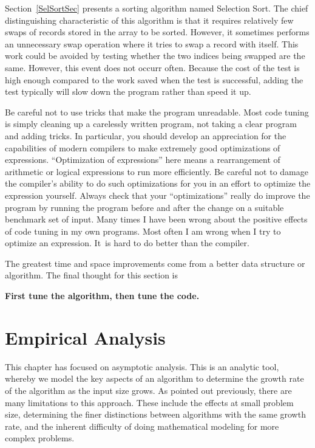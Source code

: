 \begin{example}
Section~\ref{SelSortSec} presents a sorting algorithm named Selection
Sort.
The chief distinguishing characteristic of this algorithm is that it
requires relatively few swaps of records stored in the array to be
sorted.
However, it sometimes performs an unnecessary swap operation where
it tries to swap a record with itself.
This work could be avoided by testing whether the two indices being
swapped are the same.
However, this event does not occurr often.
Because the cost of the test is high enough compared to 
the work saved when the test is successful,
adding the test typically will slow down the program rather
than speed it up.
\end{example}

Be careful not to use tricks that make the program unreadable.
Most code tuning is simply cleaning up a carelessly written program,
not taking a clear program and adding tricks.
In particular, you should develop an appreciation for the
capabilities of modern compilers to make
extremely good optimizations of expressions.
``Optimization of expressions'' here means a rearrangement of
arithmetic or logical expressions to run more efficiently.
Be careful not to damage the compiler's ability to do such
optimizations for you in an effort to optimize the expression
yourself.
Always check that your ``optimizations'' really do improve the
program by running the program before and after the change on a
suitable benchmark set of input.
Many times I have been wrong about the positive effects of code
tuning in my own programs.
Most often I am wrong when I try to optimize an expression.
It~is hard to do better than the compiler.

The greatest time and space improvements come from a better
data structure or algorithm.
The final thought for this section is

\vspace{-\medskipamount}
\begin{center}
{\bf First tune the algorithm, then tune the code.}
\end{center}

\section{Empirical Analysis}

This chapter has focused on asymptotic analysis.
This is an analytic tool, whereby we model the key aspects of an
algorithm to determine the growth rate of the algorithm as the input
size grows.
As pointed out previously, there are many limitations to this
approach.
These include the effects at small problem size, determining the finer
distinctions between algorithms with the same growth rate, and
the inherent difficulty of doing mathematical modeling for more
complex problems.

